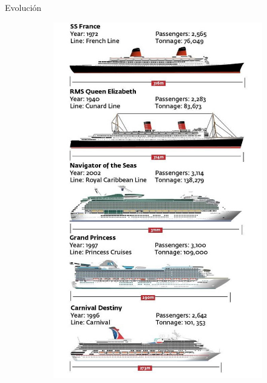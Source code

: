 \documentclass{beamer}
\begin{document}
\begin{frame}{Evolución }
\begin{figure}
\begin{subfigure}[h]{0.35\textwidth}
\end{subfigure}       
\begin{subfigure}[h]{0.35\textwidth} 
	\includegraphics[width=\textwidth]{b2}
	
\end{subfigure}

\end{figure}

\end{frame}	
\end{document}
